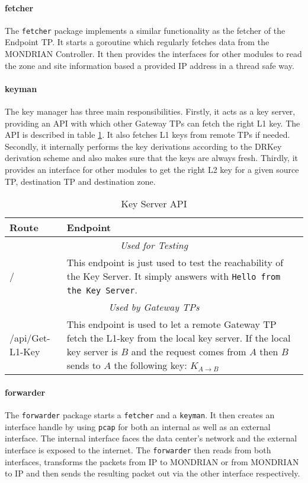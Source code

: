 \paragraph{fetcher} The \texttt{fetcher} package implements a similar functionality as the fetcher of the Endpoint \acs{TP}. It starts a goroutine which regularly fetches data from the MONDRIAN Controller. It then provides the interfaces for other modules to read the zone and site information based a provided \acs{IP} address in a thread safe way.

\paragraph{keyman} The key manager has three main responsibilities. Firstly, it acts as a key server, providing an \acs{API} with which other Gateway \acsp{TP} can fetch the right L1 key. The \acs{API} is described in table \ref{Key Server API}. It also fetches L1 keys from remote \acsp{TP} if needed. Secondly, it internally performs the key derivations according to the \acs{DRKey} derivation scheme and also makes sure that the keys are always fresh. Thirdly, it provides an interface for other modules to get the right L2 key for a given source \acs{TP}, destination \acs{TP} and destination zone.

\begin{table}[t]
\centering
\begin{tabular}{@{}p{}p{}@{}}\toprule
    \textbf{Route} & \textbf{Endpoint} \\\midrule
    \multicolumn{2}{c}{\textit{Used for Testing}}\\\midrule
    / & This endpoint is just used to test the reachability of the Key Server. It simply answers with \texttt{Hello from the Key Server}.\\ 
    \bottomrule
    \multicolumn{2}{c}{\textit{Used by Gateway \acsp{TP}}}\\\midrule
    /api/Get-L1-Key & This endpoint is used to let a remote Gateway \acs{TP} fetch the L1-key from the local key server. If the local key server is $B$ and the request comes from $A$ then $B$ sends to $A$ the following key: $K_{A \to B}$\\ 
    \bottomrule
\end{tabular}
    \caption{Key Server \acs{API}}
    \label{Key Server API}
\end{table}

\paragraph{forwarder} The \texttt{forwarder} package starts a \texttt{fetcher} and a \texttt{keyman}. It then creates an interface handle by using \texttt{pcap} for both an internal as well as an external interface. The internal interface faces the data center's network and the external interface is exposed to the internet. The \texttt{forwarder} then reads from both interfaces, transforms the packets from \acs{IP} to MONDRIAN or from MONDRIAN to \acs{IP} and then sends the resulting packet out via the other interface respectively.

